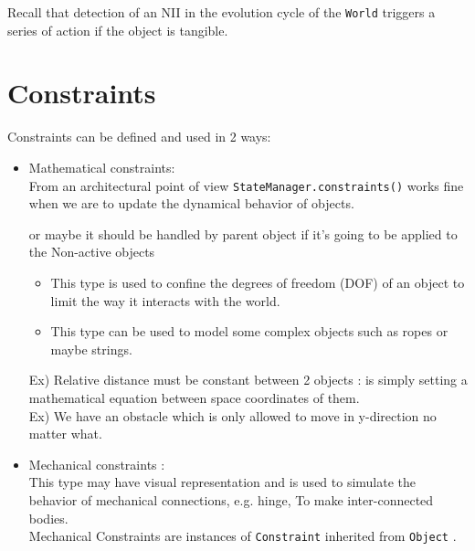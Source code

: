 \documentclass[a4paper]{report}
\newcommand{\cm}[1]{{\color{red}#1}}
\newcommand{\ai}[1]{{\color{blue}#1}}
\newcommand{\eg}[1]{{\color{violet}#1}}
\begin{document}
Recall that detection of an NII in the evolution cycle of the \verb+World+ triggers a series of action if the object is tangible.

\chapter{Constraints}
Constraints can be defined and used in 2 ways:
\begin{itemize}
	\item Mathematical constraints: \\
	From an architectural point of view \verb+StateManager.constraints()+ works fine when we are to update the dynamical behavior of objects.
	
	\cm{or maybe it should be handled by parent object if it's going to be applied to the Non-active objects} 
	\begin{itemize}
		\item 	This type is used to confine the degrees of 				freedom (DOF) of an object to limit the way it 						interacts with the world.
		\item This type can be used to model some complex 					objects such as ropes or maybe strings.
	\end{itemize}
	\eg{Ex) Relative distance must be constant between 2 objects : is simply setting a mathematical equation between space coordinates of them.}\\
	\eg{Ex) We have an obstacle which is only allowed to move in y-direction no matter what.}
	\item Mechanical constraints :\\
	
	This type may have visual representation and is used to simulate the behavior of mechanical connections, e.g. hinge, To make inter-connected bodies.\\
	\cm{Mechanical Constraints are instances of} \verb+Constraint+ \cm{inherited from} \verb+Object+ . \\
	
\end{itemize}




\end{document}
